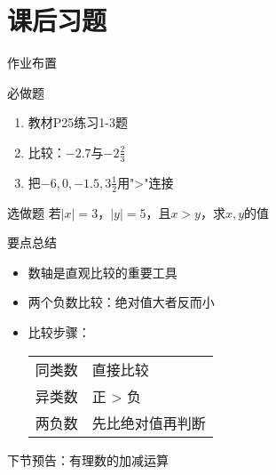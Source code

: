 \documentclass{ctexbeamer}
\begin{document}
\section{课后习题}
\begin{frame}{作业布置}
    \begin{block}{必做题}
        \begin{enumerate}
            \item 教材P25练习1-3题
            \item 比较：$-2.7$与$-2\frac{2}{3}$
            \item 把$-6, 0, -1.5, 3\frac{1}{2}$用">"连接
        \end{enumerate}
    \end{block}
    
    \begin{block}{选做题}
        若$|x| = 3$，$|y| = 5$，且$x > y$，求$x,y$的值
    \end{block}
\end{frame}

\begin{frame}{要点总结}
    \begin{itemize}
        \item \alert{数轴}是直观比较的重要工具
        \item 两个负数比较：绝对值大者反而小
        \item 比较步骤：\\
        \begin{tabular}{ll}
            同类数 & 直接比较\\
            异类数 & 正 > 负\\
            两负数 & 先比绝对值再判断
        \end{tabular}
    \end{itemize}
    
    \vspace{1cm}
    \centering
    \alert{下节预告：有理数的加减运算}
\end{frame}
\end{document}
